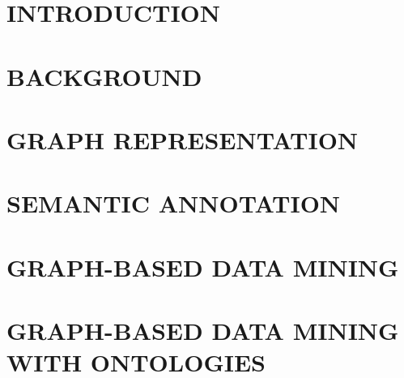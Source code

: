 \documentclass[dissertation,copyright,draftimages,final,numbers,sort&compress,gsmodern]{uothesis}
\author{Haishan Liu}
\theoremstyle{definition}
\begin{document}
\maketitle

\chapter{INTRODUCTION}
\label{chap:introduction}



\chapter{BACKGROUND}
\label{chap:background}



\chapter{GRAPH REPRESENTATION}
\label{chap:representation}



\chapter{SEMANTIC ANNOTATION}
\label{chap:annotation}



\chapter{GRAPH-BASED DATA MINING}
\label{chap:datamining}


\chapter{GRAPH-BASED DATA MINING WITH ONTOLOGIES}
\label{chap:miningWithOnto}



%
\end{document}
